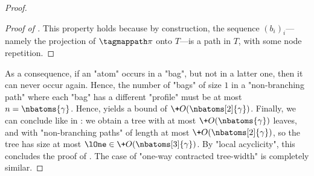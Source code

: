 \begin{proof}
\begin{proof}[Proof of ]
		This property holds because by construction, the sequence $(b_i)_i$---namely the projection of
		$\tagmappath\pi$ onto $T$---is a path in $T$, with some node repetition.
	\end{proof}
	As a consequence,
	if an "atom" occurs in a "bag", but not in a latter one, then it can never occur again.
	Hence, the number of "bags" of size $1$ in a "non-branching path" where each "bag"
	has a different "profile" must be at most $n = \nbatoms{\gamma}$. Hence, 
	yields a bound of $\+O(\nbatoms[2]{\gamma})$.
	Finally, we can conclude like in : we obtain a tree
	with at most $\+O(\nbatoms{\gamma})$ leaves, and with "non-branching paths" of length
	at most $\+O(\nbatoms[2]{\gamma})$, so the tree has size at most $\lOne \in \+O(\nbatoms[3]{\gamma})$.
	By "local acyclicity", this concludes the proof of .
	The case of "one-way contracted tree-width" is completely similar.
\end{proof}

